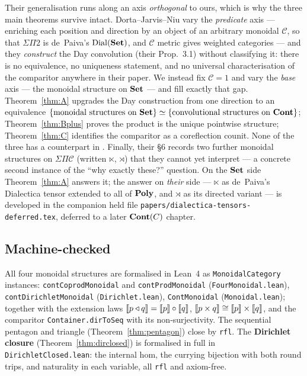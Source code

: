 Their generalisation runs along an axis \emph{orthogonal} to ours, which is why
the three main theorems survive intact. Dorta--Jarvis--Niu vary the
\emph{predicate} axis --- enriching each position and direction by an object of an
arbitrary monoidal $\mathcal C$, so that $\Sigma\Pi 2$ is de~Paiva's
$\mathrm{Dial}(\mathbf{Set})$, and $\mathcal C$ metric gives weighted categories --- and
they \emph{construct} the Day convolution (their Prop.~3.1) without classifying
it: there is no equivalence, no uniqueness statement, and no universal
characterisation of the comparitor anywhere in their paper. We instead fix
$\mathcal C=1$ and vary the \emph{base} axis --- the monoidal structure on
$\mathbf{Set}$ --- and fill exactly that gap. Theorem~\ref{thm:A} upgrades the Day
construction from one direction to an equivalence $\{\text{monoidal structures on
}\mathbf{Set}\}\simeq\{\text{convolutional structures on }\mathbf{Cont}\}$;
Theorem~\ref{thm:Bplus} proves the product is the unique pointwise structure;
Theorem~\ref{thm:C} identifies the comparitor as a coreflection counit. None of
the three has a counterpart in \cite{DJN23}. Finally, their §6 records two
further monoidal structures on $\Sigma\Pi\mathcal C$ (written $\ltimes$,
$\rtimes$) that they cannot yet interpret --- a concrete second instance of the
``why exactly these?'' question. On the $\mathbf{Set}$ side Theorem~\ref{thm:A} answers
it; the answer on \emph{their} side --- $\ltimes$ as de~Paiva's Dialectica tensor
extended to all of $\mathbf{Poly}$, and $\rtimes$ as its directed variant --- is
developed in the companion held file
\texttt{papers/dialectica-tensors-deferred.tex}, deferred to a later
$\mathbf{Cont}(C)$ chapter.

\subsection*{Machine-checked}

All four monoidal structures are formalised in Lean~4 as
\texttt{MonoidalCategory} instances: \texttt{contCoprodMonoidal} and
\texttt{contProdMonoidal} (\texttt{FourMonoidal.lean}),
\texttt{contDirichletMonoidal} (\texttt{Dirichlet.lean}), \texttt{ContMonoidal}
(\texttt{Monoidal.lean}); together with the extension laws
$\llbracket p\mathbin{\triangleleft} q \rrbracket=\llbracket p \rrbracket\circ\llbracket q \rrbracket$, $\llbracket p\times q \rrbracket\cong\llbracket p \rrbracket\times\llbracket q \rrbracket$, and
the comparitor \texttt{Container.dirToSeq} with its non-surjectivity. The
sequential pentagon and triangle (Theorem~\ref{thm:pentagon}) close by
\texttt{rfl}. The \textbf{Dirichlet closure} (Theorem~\ref{thm:dirclosed}) is
formalised in full in \texttt{DirichletClosed.lean}: the internal hom, the
currying bijection with both round trips, and naturality in each variable, all
\texttt{rfl} and axiom-free.

